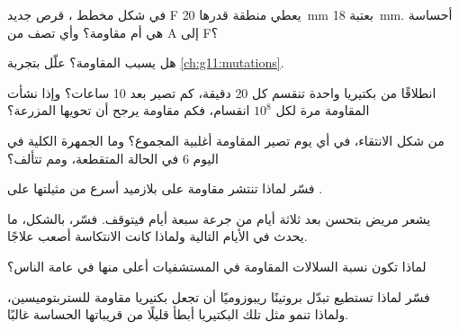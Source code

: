 \begin{exercise}[$\star$]\label{exo:g11:antibiotic-resistance:4}
في شكل مخطط ، قرص جديد F يعطي منطقة قدرها \qty{20}{mm}
بعتبة \qty{18}{mm}. أحساسة هي أم مقاومة؟ وأي  تصف من A إلى F؟
\end{exercise}

\begin{exercise}[$\star$]\label{exo:g11:antibiotic-resistance:5}
هل يسبب   المقاومة؟ علّل بتجربة
\cref{ch:g11:mutations}.
\end{exercise}

\begin{exercise}[$\star\star$]\label{exo:g11:antibiotic-resistance:6}
انطلاقًا من بكتيريا واحدة تنقسم كل 20 دقيقة، كم تصير بعد 10 ساعات؟
وإذا نشأت المقاومة مرة لكل $10^8$ انقسام، فكم  مقاومة يرجح أن
تحويها المزرعة؟
\end{exercise}

\begin{exercise}[$\star\star$]\label{exo:g11:antibiotic-resistance:7}
من شكل الانتقاء، في أي يوم تصير  المقاومة أغلبية المجموع؟ وما
الجمهرة الكلية في اليوم 6 في الحالة المتقطعة، ومم تتألف؟
\end{exercise}

\begin{exercise}[$\star\star$]\label{exo:g11:antibiotic-resistance:8}
فسّر لماذا تنتشر  مقاومة على بلازميد أسرع من مثيلتها على .
\end{exercise}

\begin{exercise}[$\star\star$]\label{exo:g11:antibiotic-resistance:9}
يشعر مريض بتحسن بعد ثلاثة أيام من جرعة سبعة أيام فيتوقف. فسّر، بالشكل،
ما يحدث في الأيام التالية ولماذا كانت الانتكاسة أصعب علاجًا.
\end{exercise}

\begin{exercise}[$\star\star$]\label{exo:g11:antibiotic-resistance:10}
لماذا تكون نسبة السلالات المقاومة في المستشفيات أعلى منها في عامة
الناس؟
\end{exercise}

\begin{exercise}[$\star\star$]\label{exo:g11:antibiotic-resistance:11}
فسّر لماذا تستطيع  تبدّل بروتينًا ريبوزوميًا أن تجعل بكتيريا مقاومة
للستربتوميسين، ولماذا تنمو مثل تلك البكتيريا أبطأ قليلًا من قريباتها
الحساسة غالبًا.
\end{exercise}

